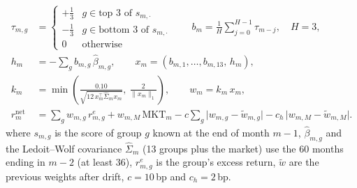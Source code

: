 \begin{align}
\tau_{m,g} &= \begin{cases} +\tfrac13 & g \in \text{top 3 of } s_{m,\cdot}\\ -\tfrac13 & g \in \text{bottom 3 of } s_{m,\cdot}\\ 0 & \text{otherwise}\end{cases}
  \qquad b_{m} = \frac{1}{H}\sum_{j=0}^{H-1} \tau_{m-j}, \quad H=3, \label{eq:tranche}\\
h_{m} &= -\sum_{g} b_{m,g}\,\hat\beta_{m,g}, \qquad x_m = (b_{m,1},\dots,b_{m,13},\,h_m), \label{eq:hedge}\\
k_m &= \min\!\left(\frac{0.10}{\sqrt{12\,x_m^{\top}\hat\Sigma_m x_m}},\ \frac{2}{\lVert x_m\rVert_1}\right), \qquad w_m = k_m\,x_m, \label{eq:scale}\\
r^{\mathrm{net}}_{m} &= \sum_{g} w_{m,g}\, r^{e}_{m,g} + w_{m,M}\,\mathrm{MKT}_m
  - c\sum_{g}\lvert w_{m,g}-\tilde w_{m,g}\rvert - c_h\,\lvert w_{m,M}-\tilde w_{m,M}\rvert. \label{eq:net}
\end{align}
where $s_{m,g}$ is the score of group $g$ known at the end of month $m-1$, $\hat\beta_{m,g}$ and the Ledoit--Wolf covariance
$\hat\Sigma_m$ (13 groups plus the market) use the 60 months ending in $m-2$ (at least 36), $r^{e}_{m,g}$ is the group's excess
return, $\tilde w$ are the previous weights after drift, $c=10$\,bp and $c_h=2$\,bp.
